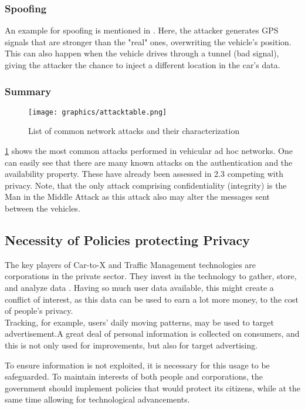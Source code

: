 \subsubsection{Spoofing}
An example for spoofing is mentioned in \cite{adhocNetworking}. Here, the attacker generates GPS signals that are stronger than the "real" ones, overwriting the vehicle's position. This can also happen when the vehicle drives through a tunnel (bad signal), giving the attacker the chance to inject a different location in the car's data.

\subsubsection{Summary}
\begin{figure}[h!]
        \centering
        \texttt{[image: graphics/attacktable.png]}
        \caption{List of common network attacks and their characterization \cite{adhocNetworking}}
        \label{fig:networkAttacks}
\end{figure}

\ref{fig:networkAttacks} shows the most common attacks performed in vehicular ad hoc networks. One can easily see that there are many known attacks on the authentication and the availability property. These have already been assessed in 2.3 competing with privacy. Note, that the only attack comprising confidentiality (integrity) is the Man in the Middle Attack as this attack also may alter the messages sent between the vehicles.

\subsection{Necessity of Policies protecting Privacy}
The key players of Car-to-X and Traffic Management technologies are corporations in the private sector. They invest in the technology to gather, store, and analyze data \cite{broederspolicy}. Having so much user data available, this might create a conflict of interest, as this data can be used to earn a lot more money, to the cost of people's privacy. \\
Tracking, for example, users' daily moving patterns, may be used to target advertisement.A great deal of personal information is collected on consumers, and this is not only used for improvements, but also for target advertising.

To ensure information is not exploited, it is necessary for this usage to be safeguarded. To maintain interests of both people and corporations, the government should implement policies that would protect its citizens, while at the same time allowing for technological advancements.
